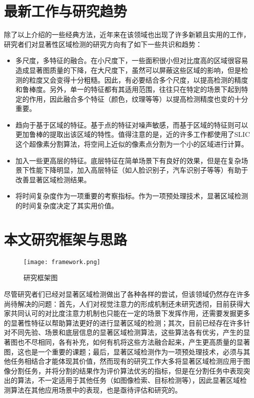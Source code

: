 \section{最新工作与研究趋势}
除了以上介绍的一些经典方法，近年来在该领域也出现了许多新颖且实用的工作\cite{borji2012salient}\cite{yan2013hierarchical}\cite{shi2013pisa}\cite{wei2012geodesic}，研究者们对显著性区域检测的研究方向有了如下一些共识和趋势：
\begin{itemize}
\item 多尺度，多特征的融合。在小尺度下，一些面积很小但对比度高的区域很容易造成显著图质量的下降，在大尺度下，虽然可以屏蔽这些区域的影响，但是检测的粒度又会变得十分粗糙。因此，有必要结合多个尺度，以提高检测的精度和鲁棒度。另外，单一的特征都有其适用范围，往往只在特定的场景下起到特定的作用，因此融合多个特征（颜色，纹理等等）以提高检测精度也变的十分重要。
\item 趋向于基于区域的特征。基于点的特征对噪声敏感，而基于区域的特征则可以更加鲁棒的提取出该区域的特性。值得注意的是，近的许多工作都使用了SLIC\cite{achanta2010slic}这个超像素分割算法，将空间上近似的像素点分割为一个小的区域进行计算。
\item 加入一些更高层的特征。底层特征在简单场景下有良好的效果，但是在复杂场景下性能下降明显，加入高层特征（如人脸识别子，汽车识别子等等）有助于改善显著区域检测结果。
\item 将时间复杂度作为一项重要的考察指标。作为一项预处理技术，显著区域检测的时间复杂度决定了其实用价值。
\end{itemize}

\section{本文研究框架与思路}
\begin{figure}[h]
\centering
\texttt{[image: framework.png]}
\caption{研究框架图} \label{fig:framework}
\end{figure}

尽管研究者们已经对显著区域检测做出了各种各样的尝试，但该领域仍然存在许多尚待解决的问题：首先，人们对视觉注意力的形成机制还未研究透彻，目前获得大家共同认可的对比度注意力机制也只能在一定的场景下发挥作用，还需要发掘更多的显著性特征以帮助算法更好的进行显著区域的检测；其次，目前已经存在许多针对不同先验、场景和底层信息的显著区域检测算法，这些算法各有优劣，产生的显著图也不尽相同，各有补充，如何有机将这些方法融合起来，产生更高质量的显著图，这也是一个重要的课题；最后，显著区域检测作为一项预处理技术，必须与其他任务相结合才能体现其价值，然而现有的研究工作大多将显著区域检测应用于图像分割任务，并将分割的结果作为评价算法优劣的指标，但是在分割任务中表现突出的算法，不一定适用于其他任务（如图像检索、目标检测等），因此显著区域检测算法在其他应用场景中的表现，也是亟待评估和研究的。

